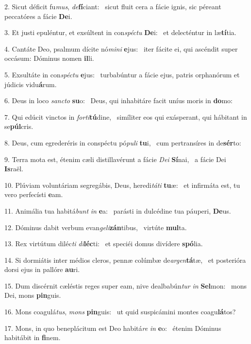 2. Sicut déficit fu\textit{mus}, \textit{de}\textbf{fí}ciant: \ast\  sicut fluit cera a fácie ignis, sic péreant peccatóres a fácie \textbf{De}i.\

3. Et justi epuléntur, et exsúltent in con\textit{spéc}\textit{tu} \textbf{De}i: \ast\  et delecténtur in læ\textbf{tí}tia.\

4. Cantáte Deo, psalmum dícite nó\textit{mi}\textit{ni} \textbf{e}jus: \ast\  iter fácite ei, qui ascéndit super occásum: Dóminus nomen \textbf{il}li.\

5. Exsultáte in con\textit{spéc}\textit{tu} \textbf{e}jus: \ast\  turbabúntur a fácie ejus, patris orphanórum et júdicis vidu\textbf{á}rum.\

6. Deus in loco \textit{sanc}\textit{to} \textbf{su}o: \ast\  Deus, qui inhabitáre facit uníus moris in \textbf{do}mo:\

7. Qui edúcit vinctos in \textit{for}\textit{ti}\textbf{tú}dine, \ast\  simíliter eos qui exásperant, qui hábitant in se\textbf{púl}cris.\

8. Deus, cum egrederéris in conspéctu pó\textit{pu}\textit{li} \textbf{tu}i, \ast\  cum pertransíres in de\textbf{sér}to:\

9. Terra mota est, étenim cæli distillavérunt a fácie \textit{De}\textit{i} \textbf{Sí}nai, \ast\  a fácie Dei \textbf{Is}raël.\

10. Plúviam voluntáriam segregábis, Deus, heredi\textit{tá}\textit{ti} \textbf{tu}æ: \ast\  et infirmáta est, tu vero perfecísti \textbf{e}am.\

11. Animália tua habitá\textit{bunt} \textit{in} \textbf{e}a: \ast\  parásti in dulcédine tua páuperi, \textbf{De}us.\

12. Dóminus dabit verbum evan\textit{ge}\textit{li}\textbf{zán}tibus, \ast\  virtúte \textbf{mul}ta.\

13. Rex virtútum diléc\textit{ti} \textit{di}\textbf{léc}ti: \ast\  et speciéi domus divídere \textbf{spó}lia.\

14. Si dormiátis inter médios cleros, pennæ colúmbæ de\textit{ar}\textit{gen}\textbf{tá}tæ, \ast\  et posterióra dorsi ejus in pallóre \textbf{au}ri.\

15. Dum discérnit cæléstis reges super eam, nive dealbabún\textit{tur} \textit{in} \textbf{Sel}mon: \ast\  mons Dei, mons \textbf{pin}guis.\

16. Mons coagulá\textit{tus}, \textit{mons} \textbf{pin}guis: \ast\  ut quid suspicámini montes coagu\textbf{lá}tos?\

17. Mons, in quo beneplácitum est Deo habitá\textit{re} \textit{in} \textbf{e}o: \ast\  étenim Dóminus habitábit in \textbf{fi}nem.\

